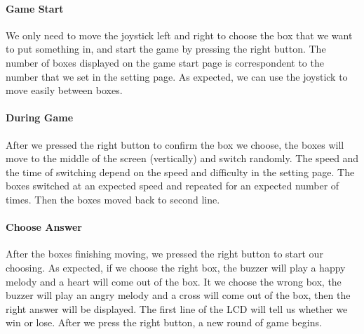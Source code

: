 \paragraph{Game Start}
We only need to move the joystick left and right to choose the box that we want to put something in, and start the game by pressing the right button. The number of boxes displayed on the game start page is correspondent to the number that we set in the setting page. As expected, we can use the joystick to move easily between boxes.
\paragraph{During Game}
After we pressed the right button to confirm the box we choose, the boxes will move to the middle of the screen (vertically)  and switch randomly. The speed and the time of switching depend on the speed and difficulty in the setting page. The boxes switched at an expected speed and repeated for an expected number of times. Then the boxes moved back to second line.
\paragraph{Choose Answer}
After the boxes finishing moving, we pressed the right button to start our choosing. As expected, if we choose the right box, the buzzer will play a happy melody and a heart will come out of the box. It we choose the wrong box, the buzzer will play an angry melody and a cross will come out of the box, then the right answer will be displayed. The first line of the LCD will tell us whether we win or lose. After we press the right button, a new round of game begins.